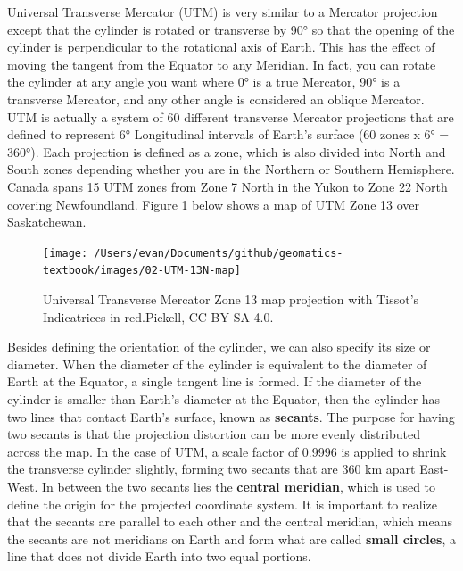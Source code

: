 \documentclass[
]{book}
\begin{document}
Universal Transverse Mercator (UTM) is very similar to a Mercator projection except that the cylinder is rotated or transverse by 90° so that the opening of the cylinder is perpendicular to the rotational axis of Earth. This has the effect of moving the tangent from the Equator to any Meridian. In fact, you can rotate the cylinder at any angle you want where 0° is a true Mercator, 90° is a transverse Mercator, and any other angle is considered an oblique Mercator. UTM is actually a system of 60 different transverse Mercator projections that are defined to represent 6° Longitudinal intervals of Earth's surface (60 zones x 6° = 360°). Each projection is defined as a zone, which is also divided into North and South zones depending whether you are in the Northern or Southern Hemisphere. Canada spans 15 UTM zones from Zone 7 North in the Yukon to Zone 22 North covering Newfoundland. Figure \ref{fig:2-UTM-13N-map} below shows a map of UTM Zone 13 over Saskatchewan.

\begin{figure}
\texttt{[image: /Users/evan/Documents/github/geomatics-textbook/images/02-UTM-13N-map]} \caption{Universal Transverse Mercator Zone 13 map projection with Tissot's Indicatrices in red.Pickell, CC-BY-SA-4.0.}\label{fig:2-UTM-13N-map}
\end{figure}

Besides defining the orientation of the cylinder, we can also specify its size or diameter. When the diameter of the cylinder is equivalent to the diameter of Earth at the Equator, a single tangent line is formed. If the diameter of the cylinder is smaller than Earth's diameter at the Equator, then the cylinder has two lines that contact Earth's surface, known as \textbf{secants}. The purpose for having two secants is that the projection distortion can be more evenly distributed across the map. In the case of UTM, a scale factor of 0.9996 is applied to shrink the transverse cylinder slightly, forming two secants that are 360 km apart East-West. In between the two secants lies the \textbf{central meridian}, which is used to define the origin for the projected coordinate system. It is important to realize that the secants are parallel to each other and the central meridian, which means the secants are not meridians on Earth and form what are called \textbf{small circles}, a line that does not divide Earth into two equal portions.
\end{document}
